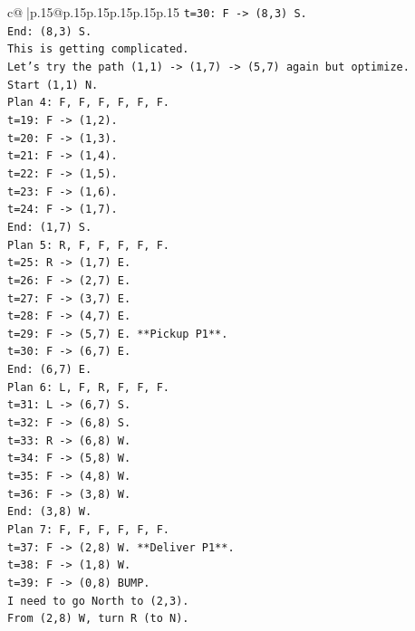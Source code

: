 \documentclass{article}
\begin{document}
{\begin{supertabular}{c@{$\;$}|p{.15\linewidth}@{}p{.15\linewidth}p{.15\linewidth}p{.15\linewidth}p{.15\linewidth}p{.15\linewidth}}
{{{\texttt{t=30: F {-}> (8,3) S.} \\
\texttt{End: (8,3) S.} \\
\texttt{This is getting complicated.} \\
\texttt{Let's try the path (1,1) {-}> (1,7) {-}> (5,7) again but optimize.} \\
\texttt{Start (1,1) N.} \\
\texttt{Plan 4: F, F, F, F, F, F.} \\
\texttt{t=19: F {-}> (1,2).} \\
\texttt{t=20: F {-}> (1,3).} \\
\texttt{t=21: F {-}> (1,4).} \\
\texttt{t=22: F {-}> (1,5).} \\
\texttt{t=23: F {-}> (1,6).} \\
\texttt{t=24: F {-}> (1,7).} \\
\texttt{End: (1,7) S.} \\
\texttt{Plan 5: R, F, F, F, F, F.} \\
\texttt{t=25: R {-}> (1,7) E.} \\
\texttt{t=26: F {-}> (2,7) E.} \\
\texttt{t=27: F {-}> (3,7) E.} \\
\texttt{t=28: F {-}> (4,7) E.} \\
\texttt{t=29: F {-}> (5,7) E. **Pickup P1**.} \\
\texttt{t=30: F {-}> (6,7) E.} \\
\texttt{End: (6,7) E.} \\
\texttt{Plan 6: L, F, R, F, F, F.} \\
\texttt{t=31: L {-}> (6,7) S.} \\
\texttt{t=32: F {-}> (6,8) S.} \\
\texttt{t=33: R {-}> (6,8) W.} \\
\texttt{t=34: F {-}> (5,8) W.} \\
\texttt{t=35: F {-}> (4,8) W.} \\
\texttt{t=36: F {-}> (3,8) W.} \\
\texttt{End: (3,8) W.} \\
\texttt{Plan 7: F, F, F, F, F, F.} \\
\texttt{t=37: F {-}> (2,8) W. **Deliver P1**.} \\
\texttt{t=38: F {-}> (1,8) W.} \\
\texttt{t=39: F {-}> (0,8) BUMP.} \\
\texttt{I need to go North to (2,3).} \\
\texttt{From (2,8) W, turn R (to N).} \\
}}}
\end{supertabular}}
\end{document}
